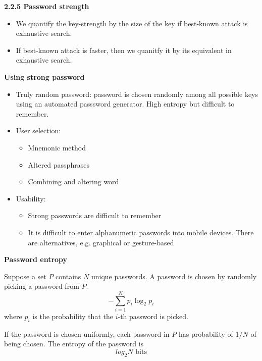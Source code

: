 \documentclass[landscape,a4paper]{extarticle}
\begin{document}
\begin{multicols*}{5}
    \textbf{2.2.5 Password strength}
    \begin{itemize}
        \item We quantify the key-strength by the size of the key if best-known attack is exhaustive search.
        \item If best-known attack is faster, then we quanitfy it by its equivalent in exhaustive search.
    \end{itemize}

    \textbf{Using strong password}
    \begin{itemize}
        \item Truly random password: password is chosen randomly among all possible keys using an automated passsword
        generator. High entropy but difficult to remember.
        \item User selection: 
        \begin{itemize}
            \item Mnemonic method
            \item Altered passphrases
            \item Combining and altering word
        \end{itemize}
        \item Usability:
        \begin{itemize}
            \item Strong passwords are difficult to remember
            \item It is difficult to enter alphanumeric passwords into mobile devices. There are alternatives,
            e.g. graphical or gesture-based
        \end{itemize}
    \end{itemize}

    \textbf{Password entropy}

    Suppose a set $P$ contains $N$ unique passwords. A password is chosen by randomly picking
    a password from $P$.     
    \begin{equation*}
        -\sum_{i=1}^N p_i \log_2p_i
    \end{equation*}
    where $p_i$ is the probability that the $i$-th password is picked.

    If the password is chosen uniformly, each password in $P$ has probability of $1/N$ of
    being chosen. The entropy of the password is
    \begin{equation*}
        log_2N \text{ bits}
    \end{equation*}


\end{multicols*}
\end{document}
